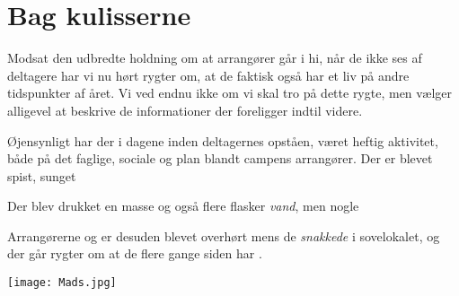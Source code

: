 \begin{minipage}[t]{130mm}
\vspace{3mm}
\section*{Bag kulisserne}

Modsat den udbredte holdning om at arrangører går i hi, når de ikke ses af deltagere har vi nu hørt rygter om, at de faktisk også har et liv på andre tidspunkter af året. Vi ved endnu ikke om vi skal tro på dette rygte, men vælger alligevel at beskrive de informationer der foreligger indtil videre.

Øjensynligt har der i dagene inden deltagernes opståen, været heftig aktivitet, både på det faglige, sociale og  plan blandt campens arrangører. Der er blevet spist, sunget

Der blev drukket en masse  og også flere flasker \emph{vand}, men nogle 

Arrangørerne  og  er desuden blevet overhørt mens de \emph{snakkede} i sovelokalet, og der går rygter om at de flere gange siden har       . 



\texttt{[image: Mads.jpg]}

\end{minipage}
